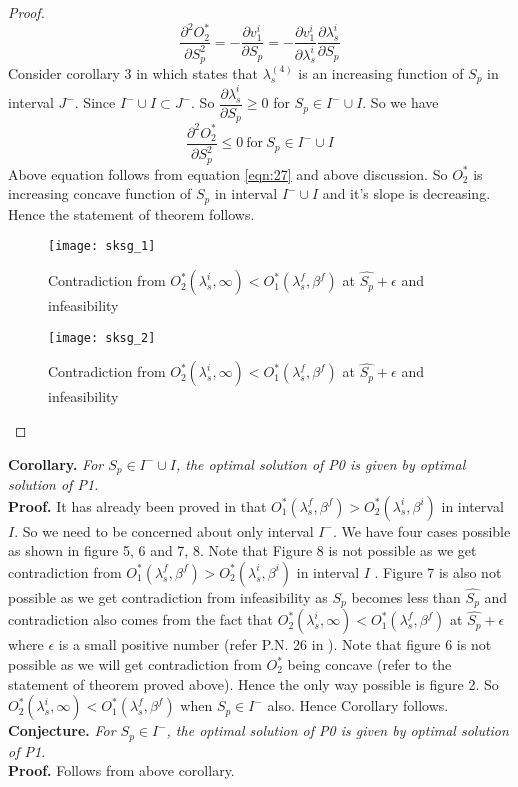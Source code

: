 \documentclass[12pt, a4paper]{report}
\begin{document}
\begin{proof}
\begin{equation}
\dfrac{\partial^2 O_2^*}{\partial S_p^2} = -\dfrac{\partial v_1^i}{\partial S_p} = -\dfrac{\partial v_1^i}{\partial \lambda_s^i}\dfrac{\partial \lambda_s^i}{\partial S_p}
\end{equation}
Consider corollary 3 in \cite{Sudhir_standard_style} which states that $\lambda_s^{(4)}$ is an increasing function of $S_p$ in interval $J^-$. Since $I^-\cup I \subset J^-$. So $\dfrac{\partial \lambda_s^i}{\partial S_p} \geq 0$ for $S_p \in I^-\cup I $. So we have  
\begin{equation}
\dfrac{\partial^2 O_2^*}{\partial S_p^2} \leq 0~\text{for}~S_p\in I^-\cup I
\end{equation}
Above equation follows from equation \ref{eqn:27} and above discussion. So $O_2^*$ is increasing concave function of $S_p$ in interval $I^- \cup I$ and it's slope is decreasing. Hence the statement of theorem follows.
\begin{figure}[ht]
\begin{minipage}[b]{0.45\textwidth}
\texttt{[image: sksg\_1]}\label{fig:7}
\caption{Contradiction from $O_2^*(\lambda_s^i,\infty) < O_1^*(\lambda_s^f,\beta^f)$ at $\hat{S_p}+\epsilon$ and infeasibility  }
\end{minipage}
\hspace{0.5cm}
\begin{minipage}[b]{0.45\textwidth}
\centering
\texttt{[image: sksg\_2]}\label{fig:8}
\caption{Contradiction from $O_2^*(\lambda_s^i,\infty) < O_1^*(\lambda_s^f,\beta^f)$ at $\hat{S_p}+\epsilon$ and infeasibility }
\end{minipage}
\end{figure}

\end{proof}
\indent \textbf{Corollary.} \textit{For $S_p \in I^- \cup I$, the optimal solution of P0 is given by optimal solution of P1.}\\
\textbf{Proof.} It has already been proved in \cite{Sudhir_standard_style} that $O_1^*(\lambda_s^f,\beta^f) > O_2^*(\lambda_s^i,\beta^i)$ in interval $I$. So we need to be concerned about only interval $I^-$. We have four cases possible as shown in figure 5, 6 and 7, 8.  Note that Figure 8 is not possible as we get contradiction from $O_1^*(\lambda_s^f,\beta^f) > O_2^*(\lambda_s^i,\beta^i)$ in interval $I$ \cite{Sudhir_standard_style}. Figure 7 is also not possible as we get contradiction from infeasibility as $S_p$ becomes less than $\hat{S_p}$ and contradiction also comes from the fact that $O_2^*(\lambda_s^i,\infty) < O_1^*(\lambda_s^f,\beta^f)$ at $\hat{S_p}+\epsilon$ where $\epsilon$ is a small positive number (refer P.N. 26 in \cite{Sudhir_standard_style}). Note that figure 6 is not possible as we will get contradiction from $O_2^*$ being concave (refer to the statement of theorem proved above). Hence the only way possible is figure 2. So $O_2^*(\lambda_s^i,\infty) < O_1^*(\lambda_s^f,\beta^f)$ when $S_p \in I^-$ also. Hence Corollary follows.\\
\indent \textbf{Conjecture.} \textit{For $S_p \in I^- $, the optimal solution of P0 is given by optimal solution of P1.}\\
\textbf{Proof.} Follows from above corollary. 
\end{document}
